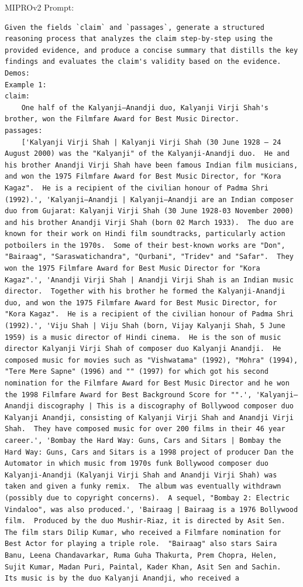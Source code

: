 \begin{instructbox}
MIPROv2 Prompt:
\begin{lstlisting}[breakindent=0pt, breaklines=true, breakatwhitespace=true, frame=single, backgroundcolor=\color{green!10}]
Given the fields `claim` and `passages`, generate a structured reasoning process that analyzes the claim step-by-step using the provided evidence, and produce a concise summary that distills the key findings and evaluates the claim's validity based on the evidence.
Demos:
Example 1:
claim:
    One half of the Kalyanji–Anandji duo, Kalyanji Virji Shah's brother, won the Filmfare Award for Best Music Director.
passages:
    ['Kalyanji Virji Shah | Kalyanji Virji Shah (30 June 1928 – 24 August 2000) was the "Kalyanji" of the Kalyanji-Anandji duo.  He and his brother Anandji Virji Shah have been famous Indian film musicians, and won the 1975 Filmfare Award for Best Music Director, for "Kora Kagaz".  He is a recipient of the civilian honour of Padma Shri (1992).', 'Kalyanji–Anandji | Kalyanji–Anandji are an Indian composer duo from Gujarat: Kalyanji Virji Shah (30 June 1928-03 November 2000) and his brother Anandji Virji Shah (born 02 March 1933).  The duo are known for their work on Hindi film soundtracks, particularly action potboilers in the 1970s.  Some of their best-known works are "Don", "Bairaag", "Saraswatichandra", "Qurbani", "Tridev" and "Safar".  They won the 1975 Filmfare Award for Best Music Director for "Kora Kagaz".', 'Anandji Virji Shah | Anandji Virji Shah is an Indian music director.  Together with his brother he formed the Kalyanji-Anandji duo, and won the 1975 Filmfare Award for Best Music Director, for "Kora Kagaz".  He is a recipient of the civilian honour of Padma Shri (1992).', 'Viju Shah | Viju Shah (born, Vijay Kalyanji Shah, 5 June 1959) is a music director of Hindi cinema.  He is the son of music director Kalyanji Virji Shah of composer duo Kalyanji Anandji.  He composed music for movies such as "Vishwatama" (1992), "Mohra" (1994), "Tere Mere Sapne" (1996) and "" (1997) for which got his second nomination for the Filmfare Award for Best Music Director and he won the 1998 Filmfare Award for Best Background Score for "".', 'Kalyanji–Anandji discography | This is a discography of Bollywood composer duo Kalyanji Anandji, consisting of Kalyanji Virji Shah and Anandji Virji Shah.  They have composed music for over 200 films in their 46 year career.', 'Bombay the Hard Way: Guns, Cars and Sitars | Bombay the Hard Way: Guns, Cars and Sitars is a 1998 project of producer Dan the Automator in which music from 1970s funk Bollywood composer duo Kalyanji-Anandji (Kalyanji Virji Shah and Anandji Virji Shah) was taken and given a funky remix.  The album was eventually withdrawn (possibly due to copyright concerns).  A sequel, "Bombay 2: Electric Vindaloo", was also produced.', 'Bairaag | Bairaag is a 1976 Bollywood film.  Produced by the duo Mushir-Riaz, it is directed by Asit Sen.  The film stars Dilip Kumar, who received a Filmfare nomination for Best Actor for playing a triple role.  "Bairaag" also stars Saira Banu, Leena Chandavarkar, Ruma Guha Thakurta, Prem Chopra, Helen, Sujit Kumar, Madan Puri, Paintal, Kader Khan, Asit Sen and Sachin.  Its music is by the duo Kalyanji Anandji, who received a 
\end{lstlisting}
\end{instructbox}
